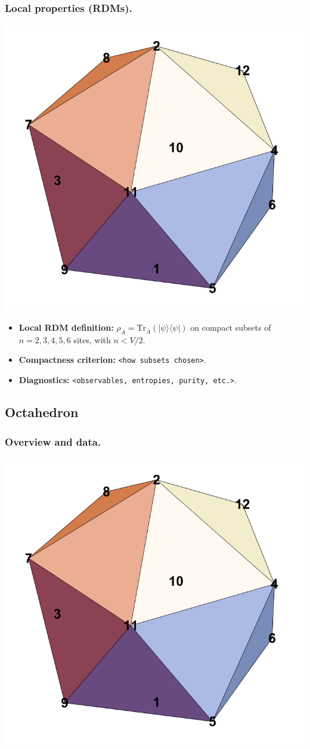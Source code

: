 \documentclass[11pt,a4paper]{article}
\begin{document}
\subsubsection*{Local properties (RDMs).}
\begin{center}
  \includegraphics[width=.6\linewidth]{icosahedron}
\end{center}

\begin{itemize}[leftmargin=1.5em]
  \item \textbf{Local RDM definition:} $\rho_A=\mathrm{Tr}_{\bar A}(|\psi\rangle\langle\psi|)$ on compact subsets of $n=2,3,4,5,6$ sites, with $n < V/2$.
  \item \textbf{Compactness criterion:} \texttt{<how subsets chosen>}.
  \item \textbf{Diagnostics:} \texttt{<observables, entropies, purity, etc.>}.
\end{itemize}


\subsection*{Octahedron}

\subsubsection*{Overview and data.}
\begin{center}
  \includegraphics[width=.6\linewidth]{icosahedron}
\end{center}
\end{document}
